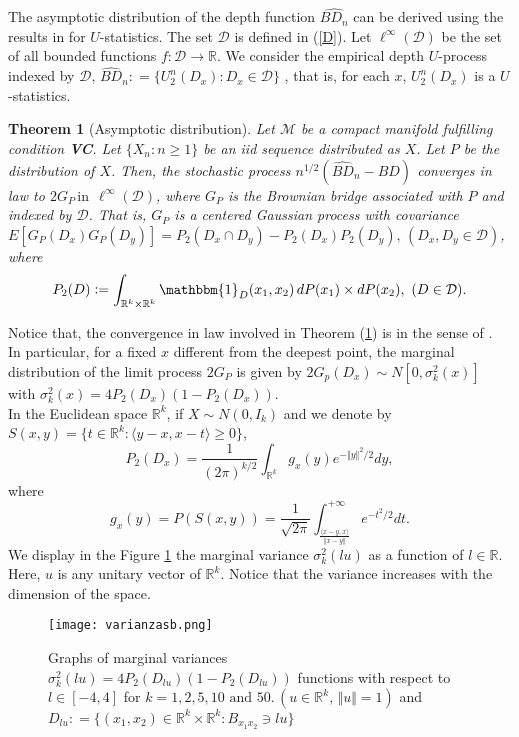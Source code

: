 \documentclass[a4paper]{article}
\def\defeq{\mathrel{\mathop:}=}
\numberwithin{equation}{section}
\newtheorem{theorem}{Theorem}[section]
\def\defeq{\mathrel{\mathop:}=}
\newcommand{\I}{\mathbbm{1}}
\begin{document}
The asymptotic distribution of the depth function $\widehat{BD_n}$ can  be derived using the results  in \cite{arcones1993} for $U$-statistics. 
The set $\mathcal{D}$ is defined in (\ref{D}). Let $\ell^\infty (\mathcal{D})$ be the set of all bounded functions  $f: \mathcal{D} \to \mathbb{R}$. 
We consider the empirical depth $U$-process indexed by $\mathcal{D}$, $\widehat{BD}_n \defeq \{U_2^n\left(D_x \right): D_x \in \mathcal{D} \}$ , that is, for each $x$, $U_2^n\left(D_x \right)$ is a $U$-statistics.
\begin{theorem} [Asymptotic distribution] 
\label{normalidad}
Let $\mathcal M$ be a compact manifold fulfilling condition \textbf{VC}. Let  $ \{ X_n : n \geq 1 \}$ be an iid sequence distributed as  $X$. Let $P$ be the distribution of $X$. Then, the stochastic process $n^{1/2} \left(\widehat{BD}_n -BD \right)$ converges in law  to  $2G_P \, \textrm{in} \ \  \ell^\infty(\mathcal{D})$, where $G_P$ is the  Brownian bridge associated with  $P$ and indexed by $\mathcal{D}$. That is, $G_P$ is a centered Gaussian process  with covariance $E \left[ G_P(D_x) G_P(D_y)\right]= P_2(D_x \cap D_y)- P_2(D_x)P_2(D_y), \, (D_x,D_y \in \mathcal{D})$,
where $$P_2(D) \defeq \int_{\mathbb{R}^k \times \mathbb{R}^k} \I_{D}(x_1,x_2) \, dP(x_1) \times dP(x_2), \,\, (D \in \mathcal{D}).$$
\end{theorem}
Notice that, the convergence in law involved in  Theorem (\ref{normalidad}) is in the sense of  \cite{hoffmann1991}.
\\
In particular, for a fixed $x$ different from the deepest point, the marginal distribution of the limit process $2G_P$ is given by $2G_p(D_x) \sim N \left[ 0, \sigma_k^2(x) \right]$ with $\sigma_k^2(x)=4  P_2(D_x) \left( 1- P_2(D_x)\right)$. 
\\
In the  Euclidean space $\mathbb{R}^k$,  if $X \sim N(0, I_k)$ and we denote by $S(x,y)= \{ t \in \mathbb{R}^k : \langle y-x,x-t \rangle \geq 0\}$, 
$$ P_2(D_x)= \frac{1}{(2\pi)^{k/2}} \int_{\mathbb{R}^k} g_x(y) e^{- \Vert y\Vert^2 /2}dy, $$
where  $$g_x(y)=P \left( S(x,y) \right)= \frac{1}{\sqrt{2\pi}} \int^{+ \infty}_{ \frac{\langle x-y,x \rangle} {\Vert x-y \Vert}} e^{-t^2/2}dt.$$
We display in the Figure \ref{varianzas} the marginal variance  $\sigma_k^2(lu)$ as a function of $l \in \mathbb{R}$. Here, $u$  is any unitary vector of $\mathbb{R}^k$. Notice that the variance increases with the dimension of the space.
\begin{figure}[!ht]
\centering
\texttt{[image: varianzasb.png]}
\caption{Graphs of  marginal variances $\sigma_k^2(lu)=4  P_2(D_{lu}) \left( 1- P_2(D_{lu})\right)$ functions with respect to $l\in [-4,4]$ for  $k= 1,2,5,10 \,\, \textrm{and} \, \, 50. \, (u \in \mathbb{R}^k,\, \Vert u \Vert=1)$ and $D_{lu} \defeq \{ (x_1,x_2) \in \mathbb{R}^k \times \mathbb{R}^k: B_{x_1 x_2} \ni lu \}$}
\label{varianzas}  
\end{figure}
\end{document}
